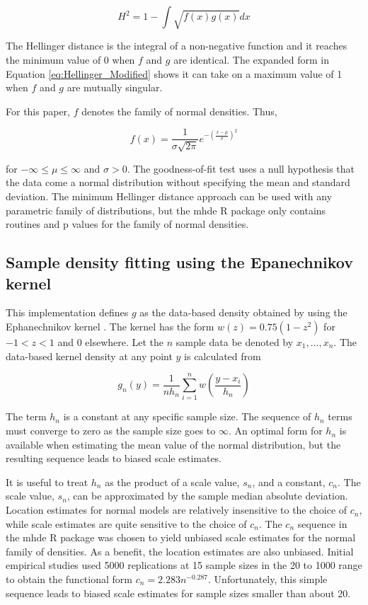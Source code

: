 \documentclass{article}
\begin{document}
\begin{equation}
\label{eq:Hellinger_Modified}
H^2 = 1 - \int\sqrt{f(x)g(x)}dx
\end{equation}

The Hellinger distance is the integral of a non-negative function and it reaches the minimum value of 0 when $f$ and $g$ are identical.  The expanded form in Equation \ref{eq:Hellinger_Modified} shows it can take on a maximum value of 1 when $f$ and $g$ are mutually singular.

For this paper, $f$ denotes the family of normal densities.  Thus,

\begin{equation}
\label{eq:f_density}
f(x) = \frac{1}{\sigma\sqrt{2\pi}}e^{-(\frac{x - \mu}{\sigma})^2}
\end{equation}

for $-\infty\leq\mu\leq\infty$ and $\sigma>0$.  The goodness-of-fit test uses a null hypothesis that the data come a normal distribution without specifying the mean and standard deviation.  The minimum Hellinger distance approach can be used with any parametric family of distributions, but the mhde R package only contains routines and p values for the family of normal densities.

\subsection{Sample density fitting using the Epanechnikov kernel}

This implementation defines $g$ as the data-based density obtained by using the Ephanechnikov kernel \parencite{epanechnikov1969}.  The kernel has the form $w(z)=0.75(1-z^2 )$ for $-1<z<1$ and 0 elsewhere.  Let the $n$ sample data be denoted by $x_1, ..., x_n$.  The data-based kernel density at any point $y$ is calculated from

\begin{equation}
\label{eq:g_density}
g_n(y) = \frac{1}{nh_n}\sum\limits_{i=1}^n w(\frac{y-x_i}{h_n})
\end{equation}

The term $h_n$ is a constant at any specific sample size.  The sequence of $h_n$ terms must converge to zero as the sample size goes to $\infty$.  An optimal form for $h_n$ is available \parencite{schucany1977} when estimating the mean value of the normal distribution, but the resulting sequence leads to biased scale estimates.

It is useful to treat $h_n$ as the product of a scale value, $s_n$, and a constant, $c_n$.  The scale value, $s_n$, can be approximated by the sample median absolute deviation.  Location estimates for normal models are relatively insensitive to the choice of $c_n$, while scale estimates are quite sensitive to the choice of $c_n$.  The $c_n$ sequence in the mhde R package was chosen to yield unbiased scale estimates for the normal family of densities.  As a benefit, the location estimates are also unbiased.  Initial empirical studies \parencite{eslinger1991} used 5000 replications at 15 sample sizes in the 20 to 1000 range to obtain the functional form $c_n=2.283n^{-0.287}$.  Unfortunately, this simple sequence leads to biased scale estimates for sample sizes smaller than about 20.
\end{document}
